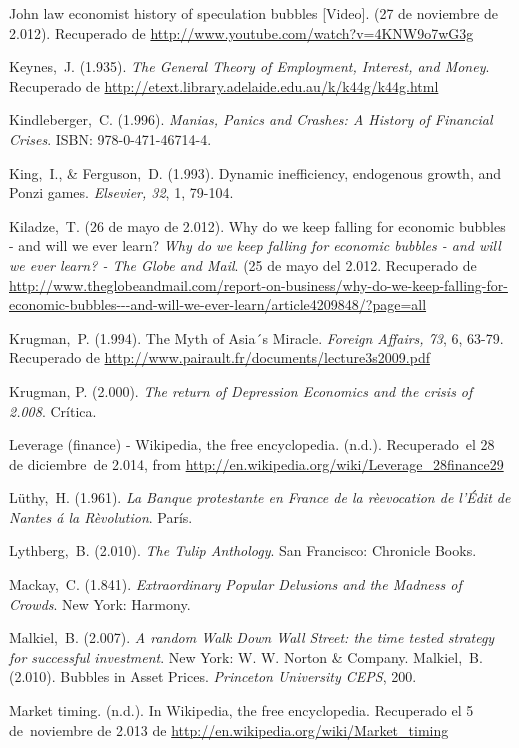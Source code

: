 \begin{thebibliography}{11}
	\bibitem{}
		John law economist history of speculation bubbles [Video]. (27 de noviembre de 2.012). Recuperado de \url{http://www.youtube.com/watch?v=4KNW9o7wG3g}

	\bibitem{}
		Keynes, J. (1.935). \emph{The General Theory of Employment, Interest, and Money}. Recuperado de \url{http://etext.library.adelaide.edu.au/k/k44g/k44g.html}

	\bibitem{}
		Kindleberger, C. (1.996). \emph{Manias, Panics and Crashes: A History of Financial Crises}. ISBN: 978-0-471-46714-4.  

	\bibitem{}
		King, I., \& Ferguson, D. (1.993). Dynamic inefficiency, endogenous growth, and Ponzi games.  \emph{Elsevier, 32}, 1, 79-104.

	\bibitem{}
		Kiladze, T. (26 de mayo de 2.012). Why do we keep falling for economic bubbles - and will we ever learn? \emph{Why do we keep falling for economic bubbles - and will we ever learn? - The Globe and Mail}. (25 de mayo del 2.012. Recuperado de \url{http://www.theglobeandmail.com/report-on-business/why-do-we-keep-falling-for-economic-bubbles---and-will-we-ever-learn/article4209848/?page=all}

	\bibitem{}
		Krugman, P. (1.994). The Myth of Asia´s Miracle. \emph{Foreign Affairs, 73}, 6, 63-79. Recuperado de \url{http://www.pairault.fr/documents/lecture3s2009.pdf}

	\bibitem{}
		Krugman, P. (2.000). \emph{The return of Depression Economics and the crisis of 2.008}. Crítica.

	\bibitem{}
		Leverage (finance) - Wikipedia, the free encyclopedia. (n.d.). Recuperado el 28 de diciembre de 2.014, from \url{http://en.wikipedia.org/wiki/Leverage\_28finance29}

	\bibitem{}
		Lüthy, H. (1.961). \emph{La Banque protestante en France de la rèevocation de l’Édit de Nantes á la Rèvolution}. París. 	

	\bibitem{}
		Lythberg, B. (2.010). \emph{The Tulip Anthology}. San Francisco: Chronicle Books. 	

	\bibitem{}
		Mackay, C. (1.841). \emph{Extraordinary Popular Delusions and the Madness of Crowds}. New York: Harmony. 

	\bibitem{}
		Malkiel, B. (2.007). \emph{A random Walk Down Wall Street: the time tested strategy for successful investment}. New York: W. W. Norton \& Company.  
	\bibitem{}
		Malkiel, B. (2.010). Bubbles in Asset Prices. \emph{Princeton University CEPS}, 200. 

	\bibitem{}
		Market timing. (n.d.). In Wikipedia, the free encyclopedia. Recuperado el 5 de noviembre de 2.013 de \url{http://en.wikipedia.org/wiki/Market\_timing}


\end{thebibliography}
